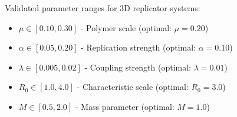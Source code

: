 \documentclass[11pt]{article}
\begin{document}
Validated parameter ranges for 3D replicator systems:
\begin{itemize}
\item $\mu \in [0.10, 0.30]$ - Polymer scale (optimal: $\mu = 0.20$)
\item $\alpha \in [0.05, 0.20]$ - Replication strength (optimal: $\alpha = 0.10$)
\item $\lambda \in [0.005, 0.02]$ - Coupling strength (optimal: $\lambda = 0.01$)
\item $R_0 \in [1.0, 4.0]$ - Characteristic scale (optimal: $R_0 = 3.0$)
\item $M \in [0.5, 2.0]$ - Mass parameter (optimal: $M = 1.0$)
\end{itemize}
\end{document}
